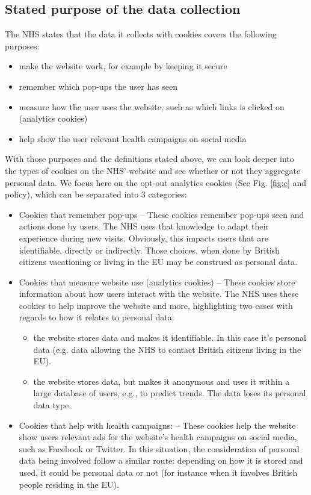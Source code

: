 \documentclass[twocolumn, letterpaper,13pt]{scrartcl}
\begin{document}
	    \subsection*{Stated purpose of the data collection}
	    
	    The NHS states that the data it collects with cookies covers the following purposes:
	    
	    \begin{itemize}
	    \item make the website work, for example by keeping it secure
        \item remember which pop-ups the user has seen
        \item measure how the user uses the website, such as which links is clicked on (analytics cookies)
        \item help show the user relevant health campaigns on social media
        \end{itemize}

	    With those purposes and the definitions stated above, we can look deeper into the types of cookies on the NHS' website and see whether or not they aggregate personal data. We focus here on the opt-out analytics cookies (See Fig. \ref{fig:c} and policy\cite{cookiepolicy}), which can be separated into 3 categories: 
	    \begin{itemize}
	    \item Cookies that remember pop-ups -- These cookies remember pop-ups seen and actions done by users. The NHS uses that knowledge to adapt their experience during new visits. Obviously, this impacts users that are identifiable, directly or indirectly. Those choices, when done by British citizens vacationing or living in the EU may be construed as personal data.
        \item Cookies that measure website use (analytics cookies) -- These cookies store information about how users interact with the website. The NHS uses these cookies to help improve the website and more, highlighting two cases with regards to how it relates to personal data:
        \begin{itemize}
            \item the website stores data and makes it identifiable. In this case it’s personal data (e.g. data allowing the NHS to contact British citizens living in the EU).
            \item the website stores data, but makes it anonymous and uses it within a large database of users, e.g., to predict trends. The data loses its personal data type.
        \end{itemize}
        \item Cookies that help with health campaigns: -- These cookies help the website show users relevant ads for the website's health campaigns on social media, such as Facebook or Twitter. In this situation, the consideration of personal data being involved follow a similar route: depending on how it is stored and used, it could be personal data or not (for instance when it involves British people residing in the EU).
        \end{itemize}
        
\end{document}
